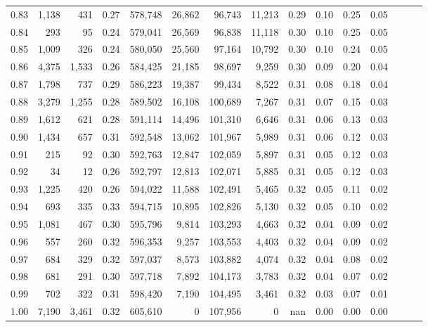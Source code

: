 \begin{tabular}{rrrrrrrrrrrrrrr}
0.83 &   1,138 &    431 &  0.27 &  578,748 &   26,862 &   96,743 &   11,213 &  0.29 &  0.10 &  0.25 &      0.05 \\
0.84 &     293 &     95 &  0.24 &  579,041 &   26,569 &   96,838 &   11,118 &  0.30 &  0.10 &  0.25 &      0.05 \\
0.85 &   1,009 &    326 &  0.24 &  580,050 &   25,560 &   97,164 &   10,792 &  0.30 &  0.10 &  0.24 &      0.05 \\
0.86 &   4,375 &  1,533 &  0.26 &  584,425 &   21,185 &   98,697 &    9,259 &  0.30 &  0.09 &  0.20 &      0.04 \\
0.87 &   1,798 &    737 &  0.29 &  586,223 &   19,387 &   99,434 &    8,522 &  0.31 &  0.08 &  0.18 &      0.04 \\
0.88 &   3,279 &  1,255 &  0.28 &  589,502 &   16,108 &  100,689 &    7,267 &  0.31 &  0.07 &  0.15 &      0.03 \\
0.89 &   1,612 &    621 &  0.28 &  591,114 &   14,496 &  101,310 &    6,646 &  0.31 &  0.06 &  0.13 &      0.03 \\
0.90 &   1,434 &    657 &  0.31 &  592,548 &   13,062 &  101,967 &    5,989 &  0.31 &  0.06 &  0.12 &      0.03 \\
0.91 &     215 &     92 &  0.30 &  592,763 &   12,847 &  102,059 &    5,897 &  0.31 &  0.05 &  0.12 &      0.03 \\
0.92 &      34 &     12 &  0.26 &  592,797 &   12,813 &  102,071 &    5,885 &  0.31 &  0.05 &  0.12 &      0.03 \\
0.93 &   1,225 &    420 &  0.26 &  594,022 &   11,588 &  102,491 &    5,465 &  0.32 &  0.05 &  0.11 &      0.02 \\
0.94 &     693 &    335 &  0.33 &  594,715 &   10,895 &  102,826 &    5,130 &  0.32 &  0.05 &  0.10 &      0.02 \\
0.95 &   1,081 &    467 &  0.30 &  595,796 &    9,814 &  103,293 &    4,663 &  0.32 &  0.04 &  0.09 &      0.02 \\
0.96 &     557 &    260 &  0.32 &  596,353 &    9,257 &  103,553 &    4,403 &  0.32 &  0.04 &  0.09 &      0.02 \\
0.97 &     684 &    329 &  0.32 &  597,037 &    8,573 &  103,882 &    4,074 &  0.32 &  0.04 &  0.08 &      0.02 \\
0.98 &     681 &    291 &  0.30 &  597,718 &    7,892 &  104,173 &    3,783 &  0.32 &  0.04 &  0.07 &      0.02 \\
0.99 &     702 &    322 &  0.31 &  598,420 &    7,190 &  104,495 &    3,461 &  0.32 &  0.03 &  0.07 &      0.01 \\
1.00 &   7,190 &  3,461 &  0.32 &  605,610 &        0 &  107,956 &        0 &   nan &  0.00 &  0.00 &      0.00 \\
\bottomrule
\end{tabular}
